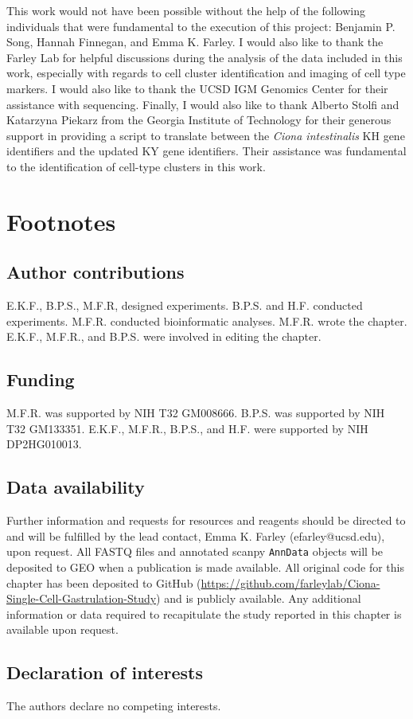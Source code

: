 This work would not have been possible without the help of the following individuals that were fundamental to the execution of this project: Benjamin P. Song, Hannah Finnegan, and Emma K. Farley. I would also like to thank the Farley Lab for helpful discussions during the analysis of the data included in this work, especially with regards to cell cluster identification and imaging of cell type markers. I would also like to thank the UCSD IGM Genomics Center for their assistance with sequencing. Finally, I would also like to thank Alberto Stolfi and Katarzyna Piekarz from the Georgia Institute of Technology for their generous support in providing a script to translate between the \textit{Ciona intestinalis} KH gene identifiers and the updated KY gene identifiers. Their assistance was fundamental to the identification of cell-type clusters in this work.

\section{Footnotes}

\subsection{Author contributions}
E.K.F., B.P.S., M.F.R, designed experiments. B.P.S. and H.F. conducted experiments. M.F.R. conducted bioinformatic analyses. M.F.R. wrote the chapter. E.K.F., M.F.R., and B.P.S. were involved in editing the chapter. 

\subsection{Funding}
M.F.R. was supported by NIH T32 GM008666. B.P.S. was supported by NIH T32 GM133351. E.K.F., M.F.R., B.P.S., and H.F. were supported by NIH DP2HG010013.

\subsection{Data availability}
Further information and requests for resources and reagents should be directed to and will be fulfilled by the lead contact, Emma K. Farley (efarley@ucsd.edu), upon request. All FASTQ files and annotated scanpy \verb|AnnData| objects will be deposited to GEO when a publication is made available. All original code for this chapter has been deposited to GitHub (\url{https://github.com/farleylab/Ciona-Single-Cell-Gastrulation-Study}) and is publicly available. Any additional information or data required to recapitulate the study reported in this chapter is available upon request.

\subsection{Declaration of interests}
The authors declare no competing interests.
